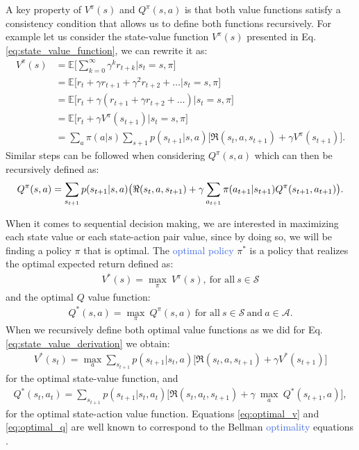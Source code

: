 A key property of $V^{\pi}(s)$ and $Q^{\pi}(s,a)$ is that both value functions satisfy a consistency condition that allows us to define both functions recursively. For example let us consider the state-value function $V^{\pi}(s)$ presented in Eq. \ref{eq:state_value_function}, we can rewrite it as:
\begin{equation}
\begin{split}
 V^{\pi}(s) & =\mathds{E}\big[\sum_{k=0}^{\infty}\gamma^{k}r_{t+k}\big| s_t = s, \pi \big] \\ 
 & =\mathds{E}\big[r_{t}+\gamma r_{t+1}+\gamma^{2}r_{t+2}+\ldots \big| s_t =s , \pi \big] \\ 
 & =\mathds{E}\big[r_{t}+\gamma(r_{t+1}+\gamma r_{t+2}+\ldots)\big| s_t =s , \pi \big] \\
 & =\mathds{E}\big[r_{t}+\gamma V^{\pi}(s_{t+1}) \big| s_t =s , \pi \big] \\
 & =\sum_a \pi(a|s) \sum_{s+1} p(s_{t+1}|s,a)\big[\Re(s_t, a, s_{t+1}) + \gamma V^{\pi}(s_{t+1}) \big].
\end{split}
\label{eq:state_value_derivation}
\end{equation}
Similar steps can be followed when considering $Q^{\pi}(s,a)$ which can then be recursively defined as:
\begin{equation}
	Q^{\pi}(s,a) = \sum_{s_{t+1}} p(s_{t+1}|s,a)\big(\Re(s_t, a, s_{t+1}) + \\ \gamma \sum_{a_{t+1}} \pi(a_{t+1}|s_{t+1}) Q^{\pi}(s_{t+1}, a_{t+1}) \big).
\end{equation}

When it comes to sequential decision making, we are interested in maximizing each state value or each state-action pair value, since by doing so, we will be finding a policy $\pi$ that is optimal. The \textcolor{RoyalBlue}{optimal policy} $\pi^{*}$ is a policy that realizes the optimal expected return defined as:
\begin{align}
 V^{*}(s)=\underset{\pi}{\max}\:V^{\pi}(s), \ \text{for all} \ s\in\mathcal{S}
\end{align}
and the optimal $Q$ value function:
\begin{align}
Q^{*}(s,a)= \underset{\pi}{\max}\:Q^{\pi}(s,a) \ \text{for all} \ s\in\mathcal{S} \ \text{and} \ a \in\mathcal{    A}.
\end{align}
When we recursively define both optimal value functions as we did for Eq. \ref{eq:state_value_derivation} we obtain:
\begin{align}
    V^{*}(s_t) = \underset{a}{\max}\sum_{s_{t+1}}p(s_{t+1} | s_{t}, a) \bigg[\Re (s_{t}, a, s_{t+1}) + \gamma V^{*}(s_{t+1}) \bigg]
    \label{eq:optimal_v}
\end{align}
for the optimal state-value function, and
\begin{multline}
    Q^{*}(s_t,a_t)=\sum_{s_{t+1}}p(s_{t+1} | s_{t}, a_{t})  \bigg[\Re (s_{t}, a_{t}, s_{t+1}) + \gamma \: \underset{a}{\max} \: Q^{*}(s_{t+1}, a) \bigg],
    \label{eq:optimal_q}
\end{multline}
for the optimal state-action value function. Equations \ref{eq:optimal_v} and \ref{eq:optimal_q} are well known to correspond to the Bellman \textcolor{RoyalBlue}{optimality} equations \cite{bellman1966dynamic}. 

